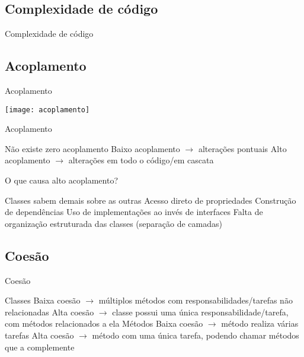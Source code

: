 \documentclass{beamer}
\begin{document}
\subsection{Complexidade de código} %

\begin{frame}{Complexidade de código}
  \begin{center}
    \resizebox{!}{2.3in}{}
  \end{center}
\end{frame}

\subsection{Acoplamento} %

\begin{frame}{Acoplamento}
  \begin{center}
    \texttt{[image: acoplamento]}
  \end{center}
\end{frame}

\begin{frame}{Acoplamento}
 \begin{outline}
    Não existe zero acoplamento
    Baixo acoplamento $\rightarrow$ alterações pontuais
    Alto acoplamento $\rightarrow$ alterações em todo o código/em cascata
 \end{outline}
\end{frame}

\begin{frame}{O que causa alto acoplamento?}
 \begin{outline}
   Classes sabem \alert{demais} sobre as outras
     Acesso direto de propriedades
     Construção de dependências
     Uso de implementações ao invés de interfaces
   Falta de organização estruturada das classes (separação de camadas)
 \end{outline}
\end{frame}

\subsection{Coesão} %

\begin{frame}{Coesão}
 \begin{outline}
   Classes
     Baixa coesão $\rightarrow$ múltiplos métodos com responsabilidades/tarefas não relacionadas
     Alta coesão $\rightarrow$ classe possui uma única responsabilidade/tarefa, com métodos relacionados a ela
   Métodos
     Baixa coesão $\rightarrow$ método realiza várias tarefas
     Alta coesão $\rightarrow$ método com uma única tarefa, podendo chamar métodos que a complemente
 \end{outline}
\end{frame}
\end{document}
